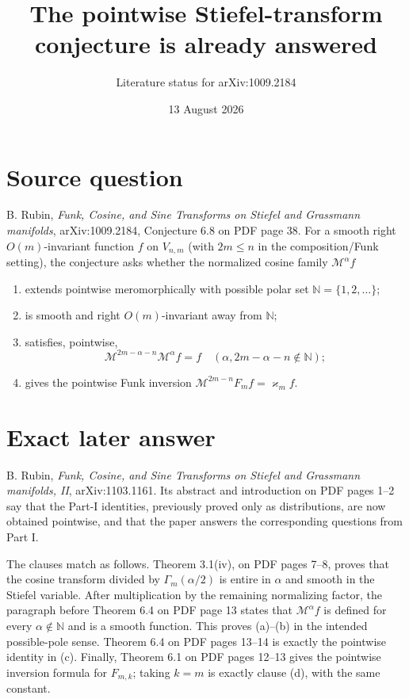 \documentclass[11pt]{article}
\title{The pointwise Stiefel-transform conjecture is already answered}
\author{Literature status for arXiv:1009.2184}
\date{13 August 2026}
\newcommand{\V}{V_{n,m}}
\newcommand{\N}{\mathbb N}
\begin{document}
\maketitle

\begin{center}
\end{center}

\section*{Source question}

B. Rubin, \emph{Funk, Cosine, and Sine Transforms on Stiefel and Grassmann
manifolds}, arXiv:1009.2184, Conjecture 6.8 on PDF page 38.
For a smooth right $O(m)$-invariant function $f$ on $\V$ (with $2m\le n$ in
the composition/Funk setting), the conjecture asks whether the normalized
cosine family $\mathcal M^\alpha f$
\begin{enumerate}
\item[(a)] extends pointwise meromorphically with possible polar set
  $\N=\{1,2,\ldots\}$;
\item[(b)] is smooth and right $O(m)$-invariant away from $\N$;
\item[(c)] satisfies, pointwise,
  \[
  \mathcal M^{2m-\alpha-n}\mathcal M^\alpha f=f
  \quad
  (\alpha,2m-\alpha-n\notin\N);
  \]
\item[(d)] gives the pointwise Funk inversion
  $\mathcal M^{2m-n}F_m f=\varkappa_m f$.
\end{enumerate}

\section*{Exact later answer}

B. Rubin, \emph{Funk, Cosine, and Sine Transforms on Stiefel and Grassmann
manifolds, II}, arXiv:1103.1161.  Its abstract and introduction on PDF pages
1--2 say that the Part-I identities, previously proved only as distributions,
are now obtained pointwise, and that the paper answers the corresponding
questions from Part I.

The clauses match as follows.  Theorem 3.1(iv), on PDF pages 7--8, proves that
the cosine transform divided by $\Gamma_m(\alpha/2)$ is entire in $\alpha$
and smooth in the Stiefel variable.  After multiplication by the remaining
normalizing factor, the paragraph before Theorem 6.4 on PDF page 13 states
that $\mathcal M^\alpha f$ is defined for every $\alpha\notin\N$ and is a
smooth function.  This proves (a)--(b) in the intended possible-pole sense.
Theorem 6.4 on PDF pages 13--14 is exactly the pointwise identity in (c).
Finally, Theorem 6.1 on PDF pages 12--13 gives the pointwise inversion formula
for $F_{m,k}$; taking $k=m$ is exactly clause (d), with the same constant.
\end{document}
